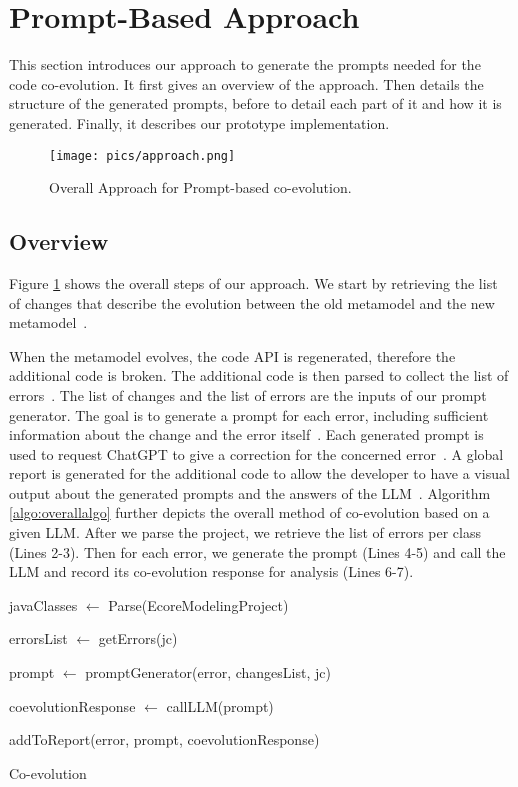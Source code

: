 \section{Prompt-Based Approach}
\label{appraoch}
This section introduces our approach to generate the prompts needed for the code co-evolution. 
It first gives an overview of the approach. Then details the structure of the generated prompts, before to detail each part of it and how it is generated. Finally, it describes our prototype implementation.  

\begin{figure}
\centering
\hspace*{-0.8cm}
\texttt{[image: pics/approach.png]}
\caption{Overall Approach for Prompt-based co-evolution.}
\label{fig: approach}
\end{figure}



\subsection{Overview}

Figure \ref{fig: approach} shows the overall steps of our approach. We start by retrieving the list of changes that describe the evolution between the old metamodel and the new metamodel~. 

When the metamodel evolves, the code API is regenerated, therefore the additional code is broken. The additional code is then parsed to collect the list of errors~. The list of changes and the list of errors are the inputs of our prompt generator. The goal is to generate a prompt for each error, including sufficient information about the change and the error itself~.
Each generated prompt is used to request ChatGPT to give a correction for the concerned error~. A global report is generated for the additional code to allow the developer to have a visual output about the generated prompts and the answers of the LLM~. Algorithm \ref{algo:overallalgo} further depicts the overall method of co-evolution based on a given LLM. After we parse the project, we retrieve the list of errors per class (Lines 2-3). Then for each error, we generate the prompt (Lines 4-5) and call the LLM and record its co-evolution response for analysis (Lines 6-7).


\begin{algorithm2e}[t]
 \small
\SetAlgoLined
{}
javaClasses $\leftarrow$ Parse(EcoreModelingProject)

{
    errorsList $\leftarrow $ getErrors(jc)
    
    {
    prompt $\leftarrow$ promptGenerator(error, changesList, jc)
    
    coevolutionResponse $\leftarrow$ callLLM(prompt)
    
    addToReport(error, prompt, coevolutionResponse)
    }
}

 
 \caption{\LLM Co-evolution}
 \label{algo:overallalgo}
\end{algorithm2e}

